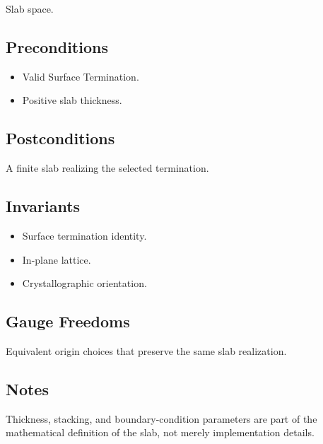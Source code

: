 Slab space.

\subsection{Preconditions}

\begin{itemize}
\item Valid Surface Termination.
\item Positive slab thickness.
\end{itemize}

\subsection{Postconditions}

A finite slab realizing the selected termination.

\subsection{Invariants}

\begin{itemize}
\item Surface termination identity.
\item In-plane lattice.
\item Crystallographic orientation.
\end{itemize}

\subsection{Gauge Freedoms}

Equivalent origin choices that preserve the same slab realization.

\subsection{Notes}

Thickness, stacking, and boundary-condition parameters are part of the
mathematical definition of the slab, not merely implementation details.

